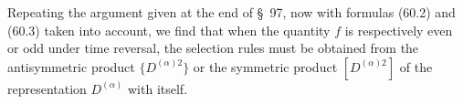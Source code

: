 Repeating the argument given at the end of \S~97, now with formulas (60.2) and (60.3) taken into account, we find that when the quantity $f$ is respectively even or odd under time reversal, the selection rules must be obtained from the antisymmetric product $\{D^{(\alpha)2}\}$ or the symmetric product $[D^{(\alpha)2}]$ of the representation $D^{(\alpha)}$ with itself.
